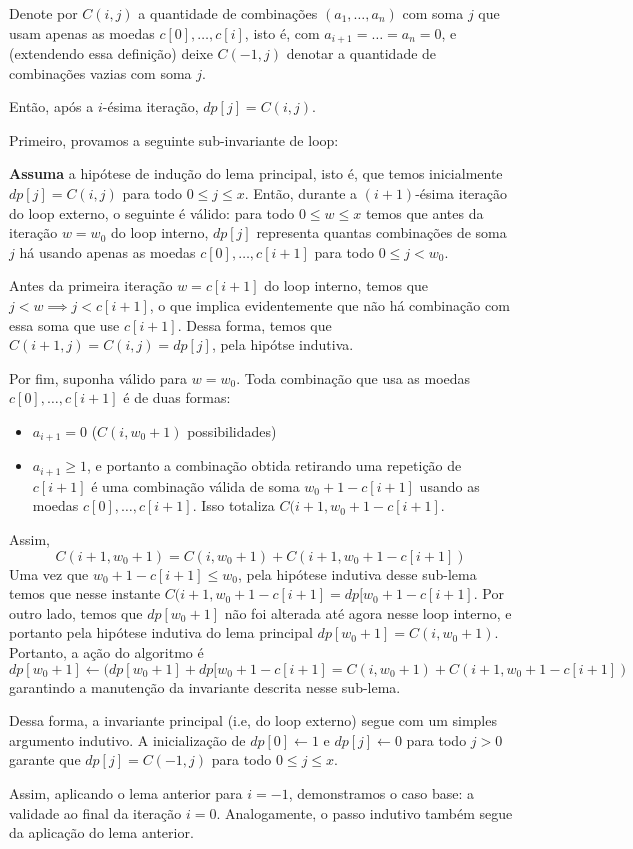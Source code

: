 \documentclass{article}
\begin{document}
\begin{lemma}
	Denote por \(C(i, j)\) a quantidade de combinações \((a_1, \dotsc, a_n)\) com soma \(j\) que usam apenas as moedas \(c[0], \dotsc, c[i]\), isto é, com \(a_{i+1} = \dotsc = a_n = 0\), e (extendendo essa definição) deixe \(C(-1, j)\) denotar a quantidade de combinações vazias com soma \(j\).

	Então, após a \(i\)-ésima iteração, \(dp[j] = C(i, j)\). 
\end{lemma}
\begin{proofenv}
	Primeiro, provamos a seguinte sub-invariante de loop:
	\begin{lemma}
		\textbf{Assuma} a hipótese de indução do lema principal, isto é, que temos inicialmente \(dp[j] = C(i, j)\) para todo \(0 \leq j \leq x\). Então, durante a \((i+1)\)-ésima iteração do loop externo, o seguinte é válido: para todo \(0 \leq w \leq x\) temos que antes da iteração \(w = w_0\) do loop interno, \(dp[j]\) representa quantas combinações de soma \(j\) há usando apenas as moedas \(c[0], \dotsc, c[i+1]\) para todo \(0 \leq j < w_0\).
	\end{lemma}
	\begin{proofenv}
		Antes da primeira iteração \(w = c[i+1]\) do loop interno, temos que \(j < w \implies j < c[i+1]\), o que implica evidentemente que não há combinação com essa soma que use \(c[i+1]\). Dessa forma, temos que \(C(i + 1, j) = C(i, j) = dp[j]\), pela hipótse indutiva.

		Por fim, suponha válido para \(w = w_0\). Toda combinação que usa as moedas \(c[0], \dotsc, c[i+1]\) é de duas formas: 
		\begin{itemize}
			\item \(a_{i+1} = 0\) (\(C(i, w_0 + 1)\) possibilidades)
			\item \(a_{i+1} \geq 1\), e portanto a combinação obtida retirando uma repetição de \(c[i+1]\) é uma combinação válida de soma \(w_0 + 1 - c[i+1]\) usando as moedas \(c[0], \dotsc, c[i+1]\). Isso totaliza \(C(i + 1, w_0 + 1 - c[i+1]\).
		\end{itemize}
		Assim,
		\[C(i + 1, w_0 + 1) = C(i, w_0 + 1) + C(i + 1, w_0 + 1 - c[i+1])\]
		Uma vez que \(w_0 + 1 - c[i+1] \leq w_0\), pela hipótese indutiva desse sub-lema temos que nesse instante \(C(i+1, w_0 + 1 - c[i+1] = dp[w_0 + 1 - c[i+1]\). Por outro lado, temos que \(dp[w_0 + 1]\) não foi alterada até agora nesse loop interno, e portanto pela hipótese indutiva do lema principal \(dp[w_0 + 1] = C(i, w_0 + 1)\). Portanto, a ação do algoritmo é 
		\[dp[w_0 + 1] \gets (dp[w_0 + 1] + dp[w_0 + 1 - c[i+1] = C(i, w_0 + 1) + C(i + 1, w_0 + 1 - c[i+1])\]
		garantindo a manutenção da invariante descrita nesse sub-lema.
	\end{proofenv}
	Dessa forma, a invariante principal (i.e, do loop externo) segue com um simples argumento indutivo. A inicialização de \(dp[0] \gets 1\) e \(dp[j] \gets 0\) para todo \(j > 0\) garante que \(dp[j] = C(-1, j)\) para todo \(0 \leq j \leq x\). 

	Assim, aplicando o lema anterior para \(i = -1\), demonstramos o caso base: a validade ao final da iteração \(i = 0\). Analogamente, o passo indutivo também segue da aplicação do lema anterior.

\end{proofenv}
\end{document}
